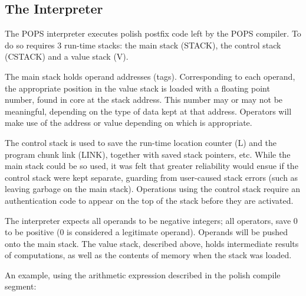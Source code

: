 \subsection{The Interpreter}
The POPS interpreter executes polish postfix code left by the POPS
compiler.  To do so requires 3 run-time stacks: the main stack
(STACK), the control stack (CSTACK) and a value stack (V).

The main stack holds operand addresses (tags).  Corresponding to each
operand, the appropriate position in the value stack is loaded with a
floating point number, found in core at the stack address.  This
number may or may not be meaningful, depending on the type of data
kept at that address.  Operators will make use of the address or value
depending on which is appropriate.

The control stack is used to save the run-time location counter (L)
and the program chunk link (LINK), together with saved stack pointers,
etc.  While the main stack could be so used, it was felt that greater
reliability would ensue if the control stack were kept separate,
guarding from user-caused stack errors (such as leaving garbage on the
main stack).  Operations using the control stack require an
authentication code to appear on the top of the stack before they are
activated.

The interpreter expects all operands to be negative integers; all
operators, save 0 to be positive (0 is considered a legitimate
operand).  Operands will be pushed onto the main stack.  The value
stack, described above, holds intermediate results of computations, as
well as the contents of memory when the stack was loaded.

An example, using the arithmetic expression described in the polish
compile segment:

